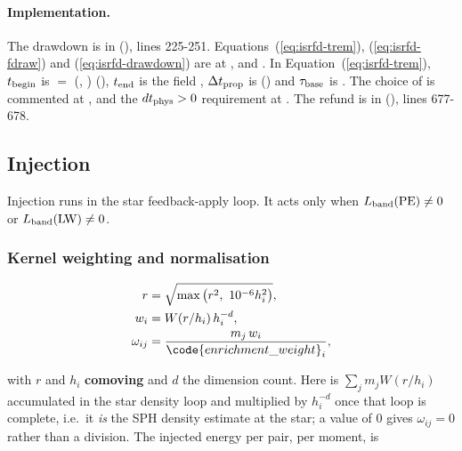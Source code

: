 \paragraph{Implementation.} The drawdown is in
 (),
lines 225-251. Equations~(\ref{eq:isrfd-trem}), (\ref{eq:isrfd-fdraw}) and
(\ref{eq:isrfd-drawdown}) are at ,
 and . In Equation~(\ref{eq:isrfd-trem}),
$t_{\rm begin}$ is  $=$
(, )
(), $t_{\rm end}$ is the field
, $\Delta t_{\rm prop}$ is
 () and
$\tau_{\rm base}$ is . The choice of  is
commented at , and the $dt_{\rm phys} > 0$ requirement at
. The refund is in
 (),
lines 677-678.

\subsection{Injection}
\label{sec:isrf-eqdisc-injection}

Injection runs in the star feedback-apply loop. It acts only when
$L_{\rm band}(\mathrm{PE}) \ne 0$ or $L_{\rm band}(\mathrm{LW}) \ne 0$.

\subsubsection{Kernel weighting and normalisation}

\begin{align}
  r &= \sqrt{\max\big(r^2,\ 10^{-6} h_i^2\big)},
  \label{eq:isrfd-inj-r} \\
  w_i &= W(r/h_i)\, h_i^{-d},
  \label{eq:isrfd-inj-w} \\
  \omega_{ij} &= \frac{m_j\, w_i}{\code{enrichment\_weight}_i},
  \label{eq:isrfd-inj-weight}
\end{align}

with
$r$ and $h_i$ \textbf{comoving} and $d$ the dimension count. Here
 is $\sum_j m_j W(r/h_i)$ accumulated in the star
density loop and multiplied by $h_i^{-d}$ once that loop is complete, i.e.\ it
\emph{is} the
SPH density estimate at the star; a value of 0 gives
$\omega_{ij} = 0$ rather than a division. The injected energy per pair, per
moment, is

